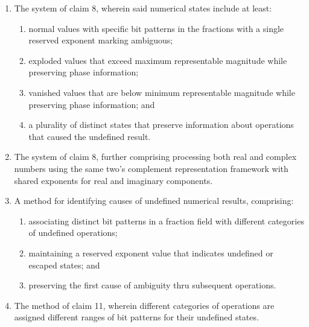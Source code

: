 \documentclass[12pt,letter]{article}
\begin{document}
\begin{enumerate}
    \item The system of claim 8, wherein said numerical states include at least:
        \begin{enumerate}
            \item normal values with specific bit patterns in the fractions with a single reserved exponent marking ambiguous;
            \item exploded values that exceed maximum representable magnitude while preserving phase information;
            \item vanished values that are below minimum representable magnitude while preserving phase information; and
            \item a plurality of distinct states that preserve information about operations that caused the undefined result.
        \end{enumerate}
    
    \item The system of claim 8, further comprising processing both real and complex numbers using the same two's complement representation framework with shared exponents for real and imaginary components.
    
    \item A method for identifying causes of undefined numerical results, comprising:
        \begin{enumerate}
            \item associating distinct bit patterns in a fraction field with different categories of undefined operations;
            \item maintaining a reserved exponent value that indicates undefined or escaped states; and
            \item preserving the first cause of ambiguity thru subsequent operations.
        \end{enumerate}
    
    \item The method of claim 11, wherein different categories of operations are assigned different ranges of bit patterns for their undefined states.
    

\end{enumerate}
\end{document}

